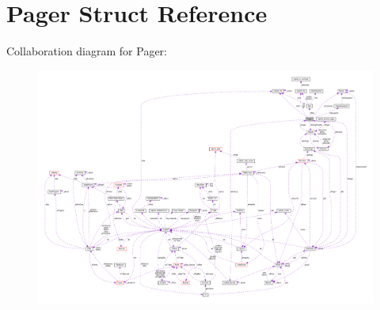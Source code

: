 \hypertarget{structPager}{}\section{Pager Struct Reference}
\label{structPager}


Collaboration diagram for Pager\+:\nopagebreak
\begin{figure}[H]
\begin{center}
\leavevmode
\includegraphics[width=350pt]{structPager__coll__graph}
\end{center}
\end{figure}
